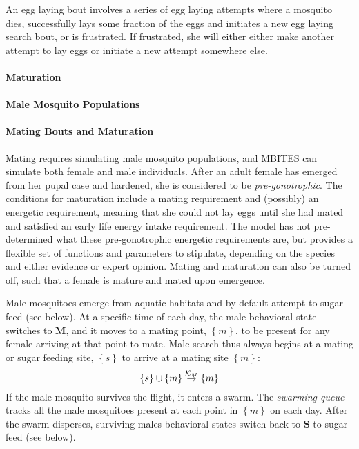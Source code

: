 \documentclass{article}
\begin{document}
An egg laying bout involves a series of egg laying attempts where a mosquito dies, successfully lays some fraction of the eggs and initiates a new egg laying search bout, or is frustrated. If frustrated, she will either either make another attempt to lay eggs or initiate a new attempt somewhere else. 


\paragraph{Maturation}

\paragraph{Male Mosquito Populations}

\paragraph{Mating Bouts and Maturation}

Mating requires simulating male mosquito populations, and MBITES can simulate both female and male individuals. After an adult female has emerged from her pupal case and hardened, she is considered to be {\em pre-gonotrophic}. The conditions for maturation include a mating requirement and (possibly) an energetic requirement, meaning that she could not lay eggs until she had mated and satisfied an early life energy intake requirement. The model has not pre-determined what these pre-gonotrophic energetic requirements are, but provides a flexible set of functions and parameters to stipulate, depending on the species and either evidence or expert opinion. Mating and maturation can also be turned off, such that a female is mature and mated upon emergence.  

Male mosquitoes emerge from aquatic habitats and by default attempt to sugar feed (see below). At a specific time of each day, the male behavioral state switches to {\bf M}, and it moves to a mating point, $\left\{ m\right\} $, to be present for any female arriving at that point to mate. Male search thus always begins at a mating or sugar feeding site, $\left\{ s\right\} $ to arrive at a mating site $\left\{ m\right\} $:
%
\begin{equation}
%
\left\{ s\right\} \cup \left\{ m\right\}  \overset{{\cal K}_M}{\rightarrow} \left\{ m\right\} 
%
\end{equation}
%
If the male mosquito survives the flight, it enters a swarm. The {\em swarming queue} tracks all the male mosquitoes present at each point in $\left\{ m\right\} $ on each day. After the swarm disperses, surviving males behavioral states switch back to {\bf S} to sugar feed (see below). 
\end{document}
